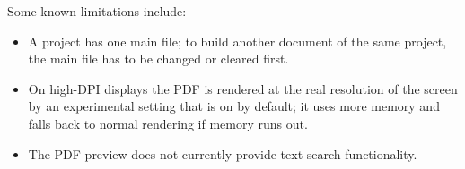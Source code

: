 \documentclass[11pt,a4paper]{article}
\begin{document}
Some known limitations include:

\begin{itemize}[noitemsep]
    \item A project has one main file; to build another
    document of the same project, the main file has to be changed
    or cleared first.
    \item On high-DPI displays the PDF is rendered at the real
    resolution of the screen by an experimental setting that is
    on by default; it uses more memory and falls back to normal
    rendering if memory runs out.
    \item The PDF preview does not currently provide
    text-search functionality.
\end{itemize}



\end{document}

